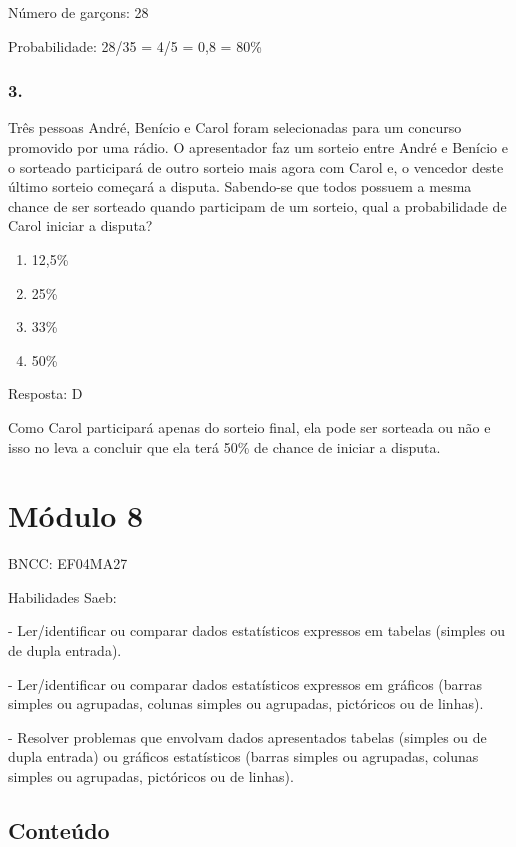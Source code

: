 Número de garçons: 28

Probabilidade: 28/35 = 4/5 = 0,8 = 80\%

\subsubsection{3.}\label{section-90}

Três pessoas André, Benício e Carol foram selecionadas para um concurso
promovido por uma rádio. O apresentador faz um sorteio entre André e
Benício e o sorteado participará de outro sorteio mais agora com Carol
e, o vencedor deste último sorteio começará a disputa. Sabendo-se que
todos possuem a mesma chance de ser sorteado quando participam de um
sorteio, qual a probabilidade de Carol iniciar a disputa?

\begin{enumerate}
\def\labelenumi{\alph{enumi})}
\item
  12,5\%
\item
  25\%
\item
  33\%
\item
  50\%
\end{enumerate}

Resposta: D

Como Carol participará apenas do sorteio final, ela pode ser sorteada ou
não e isso no leva a concluir que ela terá 50\% de chance de iniciar a
disputa.

\section{Módulo 8}\label{muxf3dulo-8}

BNCC: EF04MA27

Habilidades Saeb:

- Ler/identificar ou comparar dados estatísticos expressos em tabelas
(simples ou de dupla entrada).

- Ler/identificar ou comparar dados estatísticos expressos em gráficos
(barras simples ou agrupadas, colunas simples ou agrupadas, pictóricos
ou de linhas).

- Resolver problemas que envolvam dados apresentados tabelas (simples ou
de dupla entrada) ou gráficos estatísticos (barras simples ou agrupadas,
colunas simples ou agrupadas, pictóricos ou de linhas).

\subsection{Conteúdo}\label{conteuxfado-7}

